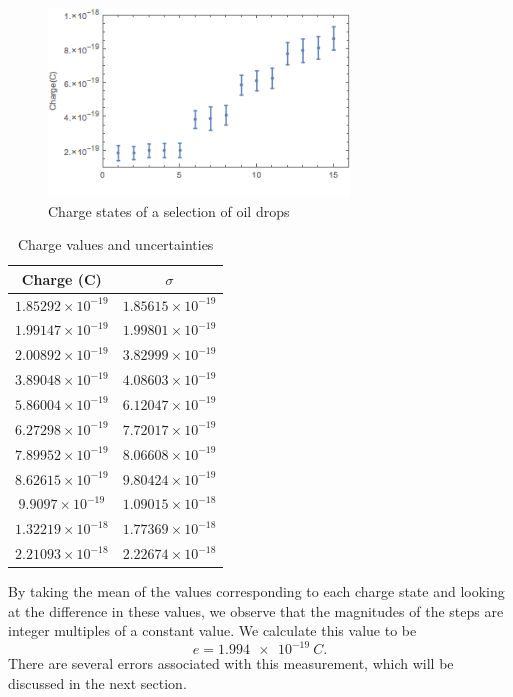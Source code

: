 \documentclass[aps, reprint,amsmath,amssymb]{revtex4-1} %
\begin{document}
\begin{figure}
\centering
\includegraphics[width=8cm]{errorBarPlot.png}
\caption{Charge states of a selection of oil drops}
\label{fig:chargeplot}
\end{figure}


\begin{table}
\begin{tabular}{ |c|c| } 
 \hline
 Charge (C) & $\sigma$ \\ \hline\hline
$1.85292\times10^{-19}$ & $1.85615\times10^{-19}$ \\
$1.99147\times10^{-19}$ & $1.99801\times10^{-19}$ \\
$2.00892\times10^{-19}$ & $3.82999\times10^{-19}$ \\
$3.89048\times10^{-19}$ & $4.08603\times10^{-19}$ \\
$5.86004\times10^{-19}$ & $6.12047\times10^{-19}$ \\
$6.27298\times10^{-19}$ & $7.72017\times10^{-19}$ \\
$7.89952\times10^{-19}$ & $8.06608\times10^{-19}$ \\
$8.62615\times10^{-19}$ & $9.80424\times10^{-19}$ \\
$9.9097\times10^{-19}$ & $1.09015\times10^{-18}$ \\
$1.32219\times10^{-18}$ & $1.77369\times10^{-18}$ \\
$2.21093\times10^{-18}$ & $2.22674\times10^{-18}$ \\ \hline
\end{tabular}
\caption{Charge values and uncertainties}
\label{fig:chargetable}
\end{table}

By taking the mean of the values corresponding to each charge state and looking at the difference in these values, we observe that the magnitudes of the steps are integer multiples of a constant value. We calculate this value to be 
\[
    e = \SI{1.994e-19}{C}.
\]
There are several errors associated with this measurement, which will be
discussed in the next section.
\end{document}
